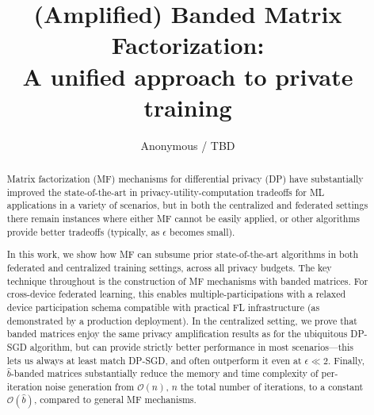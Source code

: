 \documentclass{article}
\title{%
(Amplified) Banded Matrix Factorization:\\
A unified approach to private training
}
\author{Anonymous / TBD \\ 
}
\begin{document}
\maketitle
\begin{abstract}
%
Matrix factorization (MF) mechanisms for differential privacy (DP) have substantially improved the state-of-the-art in privacy-utility-computation tradeoffs for ML applications in a variety of scenarios, but in both the centralized and federated settings there remain instances where either MF cannot be easily applied, or other algorithms provide better tradeoffs (typically, as $\epsilon$ becomes small).

In this work, we show how MF can subsume prior state-of-the-art algorithms in both federated and centralized training settings, across all privacy budgets. The key technique throughout is the construction of MF mechanisms with banded matrices. For cross-device federated learning, this enables multiple-participations with a relaxed device participation schema compatible with practical FL infrastructure (as demonstrated by a production deployment).  In the centralized setting, we prove that banded matrices enjoy the same privacy amplification results as for the ubiquitous DP-SGD algorithm, but can provide strictly better performance  in most scenarios---this lets us always at least match DP-SGD, and often outperform it even at $\epsilon\ll2$. Finally, $\hat{b}$-banded matrices substantially reduce the memory and time complexity of per-iteration noise generation from $\mathcal{O}(n)$, $n$ the total number of iterations, to a constant $\mathcal{O}(\hat{b})$, compared to general MF mechanisms.
\end{abstract}

\end{document}

